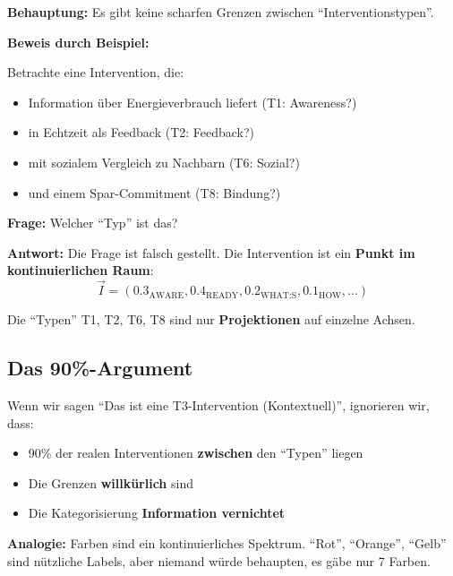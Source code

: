 \begin{tcolorbox}[colback=orange!5!white, colframe=orange!75!black,
    title=\textbf{Das Kontinuit\"{a}ts-Argument}]

\textbf{Behauptung:} Es gibt keine scharfen Grenzen zwischen ``Interventionstypen''.

\textbf{Beweis durch Beispiel:}

Betrachte eine Intervention, die:
\begin{itemize}[nosep]
\item Information \"{u}ber Energieverbrauch liefert (T1: Awareness?)
\item in Echtzeit als Feedback (T2: Feedback?)
\item mit sozialem Vergleich zu Nachbarn (T6: Sozial?)
\item und einem Spar-Commitment (T8: Bindung?)
\end{itemize}

\textbf{Frage:} Welcher ``Typ'' ist das?

\textbf{Antwort:} Die Frage ist falsch gestellt. Die Intervention ist ein \textbf{Punkt im kontinuierlichen Raum}:
\begin{equation}
\vec{I} = (0.3_{\text{AWARE}}, 0.4_{\text{READY}}, 0.2_{\text{WHAT:S}}, 0.1_{\text{HOW}}, ...)
\end{equation}

Die ``Typen'' T1, T2, T6, T8 sind nur \textbf{Projektionen} auf einzelne Achsen.

\end{tcolorbox}

\subsection{Das 90\%-Argument}
\label{sec:17-ninety}

\begin{tcolorbox}[colback=red!5!white, colframe=red!75!black,
    title=\textbf{Kritische Einsicht}]

Wenn wir sagen ``Das ist eine T3-Intervention (Kontextuell)'', ignorieren wir, dass:
\begin{itemize}[nosep]
\item 90\% der realen Interventionen \textbf{zwischen} den ``Typen'' liegen
\item Die Grenzen \textbf{willk\"{u}rlich} sind
\item Die Kategorisierung \textbf{Information vernichtet}
\end{itemize}

\textbf{Analogie:} Farben sind ein kontinuierliches Spektrum. ``Rot'', ``Orange'', ``Gelb'' sind n\"{u}tzliche Labels, aber niemand w\"{u}rde behaupten, es g\"{a}be nur 7 Farben.

\end{tcolorbox}

